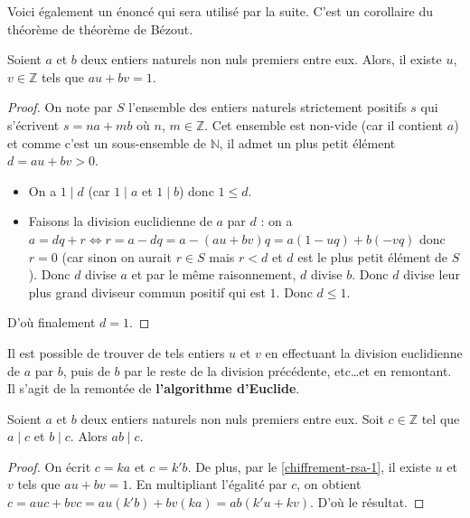   Voici également un énoncé qui sera utilisé par la suite. C'est un corollaire du théorème de théorème de Bézout.
  
  \begin{proposition}
    \label{chiffrement-rsa-1}
    Soient $a$ et $b$ deux entiers naturels non nuls premiers entre eux. Alors, il existe $u$, $v \in \mathbb{Z}$ tels que $au + bv = 1$.
  \end{proposition}
  
  \begin{proof}
    On note par $S$ l'ensemble des entiers naturels strictement positifs $s$ qui s'écrivent $s = na + mb$ où $n$, $m \in \mathbb{Z}$. Cet ensemble est non-vide (car il contient $a$) et comme c'est un sous-ensemble de $\mathbb{N}$, il admet un plus petit élément $d = au + bv > 0$.
    \begin{itemize}
      \item On a $1 \mid d$ (car $1 \mid a$ et $1 \mid b$) donc $1 \leq d$.
      \item Faisons la division euclidienne de $a$ par $d$ : on a $a = dq + r \iff r = a - dq = a  - (au + bv)q = a(1 - uq) + b(-vq)$ donc $r = 0$ (car sinon on aurait $r \in S$ mais $r < d$ et $d$ est le plus petit élément de $S$). Donc $d$ divise $a$ et par le même raisonnement, $d$ divise $b$. Donc $d$ divise leur plus grand diviseur commun positif qui est $1$. Donc $d \leq 1$.
    \end{itemize}
    D'où finalement $d = 1$.
  \end{proof}
  
  \begin{remark}
    Il est possible de trouver de tels entiers $u$ et $v$ en effectuant la division euclidienne de $a$ par $b$, puis de $b$ par le reste de la division précédente, etc\dots et en remontant. Il s'agit de la remontée de \textbf{l'algorithme d'Euclide}.
  \end{remark}
  
  \begin{corollary}
    \label{chiffrement-rsa-2}
    Soient $a$ et $b$ deux entiers naturels non nuls premiers entre eux. Soit $c \in \mathbb{Z}$ tel que $a \mid c$ et $b \mid c$. Alors $ab \mid c$.
  \end{corollary}
  
  \begin{proof}
    On écrit $c = ka$ et $c = k'b$. De plus, par le \cref{chiffrement-rsa-1}, il existe $u$ et $v$ tels que $au + bv = 1$. En multipliant l'égalité par $c$, on obtient $c = auc + bvc = au(k'b) + bv(ka) = ab(k'u+kv)$. D'où le résultat. 
  \end{proof}
  
